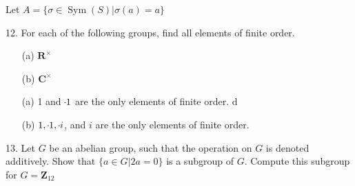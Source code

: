 \begin{mdframed}[style=darkAnswer,frametitle={Joe Starr}]
Let $A=\{\sigma \in \operatorname{Sym}(S) | \sigma(a)=a\}$
\begin{itemize}[align=left]
\end{itemize}
\end{mdframed}
\newpage
\begin{mdframed}[style=darkQuesion]
12. For each of the following groups, find all elements of finite order.
\begin{itemize}
\item []{
    (a) $\mathbf{R}^{\times}$
  }
\item []{
    (b) $\mathbf{C}^{\times}$
  }
\end{itemize}

\end{mdframed}

\begin{mdframed}[style=darkAnswer,frametitle={Joe Starr}]
\begin{itemize}[align=left]
\item [(a)]{
    1 and $\m 1$ are the only elements of finite order.
  }d
\item [(b)]{
    $1,\m 1 ,\m i$, and $i$ are the only elements of
    finite order.
  }
\end{itemize}
\end{mdframed}
\newpage
\begin{mdframed}[style=darkQuesion]
13. Let $G$ be an abelian group, such that the operation on $G$
is denoted additively.
Show that $\{a \in G | 2 a=0\}$ is a subgroup of $G .$
Compute this subgroup for $G=\mathbf{Z}_{12}$

\end{mdframed}

